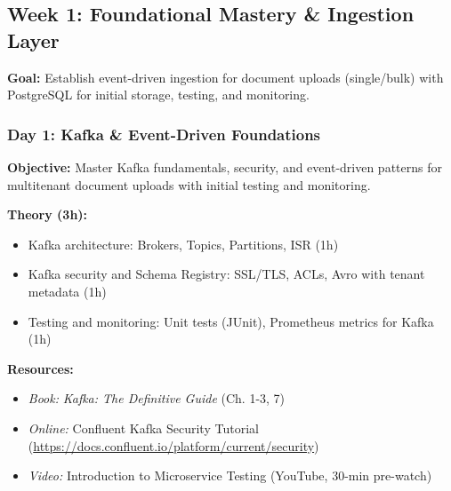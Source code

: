 \documentclass[11pt]{article}
\begin{document}
\subsection{Week 1: Foundational Mastery \& Ingestion Layer}
\textbf{Goal:} Establish event-driven ingestion for document uploads (single/bulk) with PostgreSQL for initial storage, testing, and monitoring.

\subsubsection{Day 1: Kafka \& Event-Driven Foundations}
\textbf{Objective:} Master Kafka fundamentals, security, and event-driven patterns for multitenant document uploads with initial testing and monitoring.

\textbf{Theory (3h):}
\begin{itemize}
    \item Kafka architecture: Brokers, Topics, Partitions, ISR (1h)
    \item Kafka security and Schema Registry: SSL/TLS, ACLs, Avro with tenant metadata (1h)
    \item Testing and monitoring: Unit tests (JUnit), Prometheus metrics for Kafka (1h)
\end{itemize}
\textbf{Resources:}
\begin{itemize}
    \item \textit{Book:} \textit{Kafka: The Definitive Guide} (Ch. 1-3, 7)
    \item \textit{Online:} Confluent Kafka Security Tutorial (\url{https://docs.confluent.io/platform/current/security})
    \item \textit{Video:} Introduction to Microservice Testing (YouTube, 30-min pre-watch)
\end{itemize}
\end{document}
